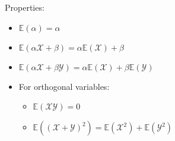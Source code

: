 Properties:
\begin{multicols}{2}
\begin{itemize}
    \item $\mathbb{E}(\alpha)=\alpha$
    \item $\mathbb{E}(\alpha\mathcal{X}+\beta)=\alpha\mathbb{E}(\mathcal{X})+\beta$
    \item $\mathbb{E}(\alpha\mathcal{X} + \beta\mathcal{Y})=\alpha\mathbb{E}(\mathcal{X})+\beta\mathbb{E}(\mathcal{Y})$
    \item For orthogonal variables:
    \begin{itemize}
        \item $\mathbb{E}(\mathcal{X}\mathcal{Y})=0$
        \item $\mathbb{E}((\mathcal{X}+\mathcal{Y})^2)=\mathbb{E}(\mathcal{X}^2) + \mathbb{E}(\mathcal{Y}^2)$
    \end{itemize}
\end{itemize}
\end{multicols}
